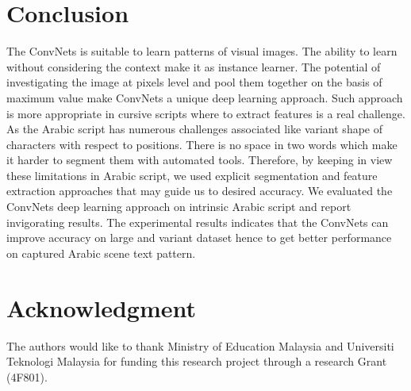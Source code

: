 \documentclass[conference]{IEEEtran}
\begin{document}
\section{Conclusion}

The ConvNets is suitable to learn patterns of visual images.
The ability to learn without considering the context make it as instance learner.
The potential of investigating the image at pixels level and pool them together on the basis of maximum value make ConvNets a unique deep learning approach.
Such approach is more appropriate in cursive scripts where to extract features is a real challenge.
As the Arabic script has numerous challenges associated like variant shape of characters with respect to positions. 
There is no space in two words which make it harder to segment them with automated tools.
Therefore, by keeping in view these limitations in Arabic script, we used explicit segmentation and feature extraction approaches that may guide us to desired accuracy.
We evaluated the ConvNets deep learning approach on intrinsic Arabic script and report invigorating results.
The experimental results indicates that the ConvNets can improve accuracy on large and variant dataset hence to get better performance on captured Arabic scene text pattern.

\section*{Acknowledgment}
The authors would like to thank Ministry of Education Malaysia and Universiti Teknologi Malaysia for funding this research project through a research Grant (4F801).


%
\end{document}
